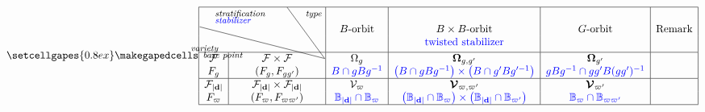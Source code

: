 \documentclass[border={7pt 0pt 200pt 0pt},varwidth]{standalone}
\newcommand{\dimvec}[1]{\mathbf{#1}}
\newcommand{\abdimvec}[1]{|\dimvec{#1}|}
\newcommand{\absgp}[1]{\mathbb{#1}}
\newcommand{\ww}{\varpi}
\newcommand{\Omcell}{\Omega}
\newcommand{\OOmcell}{\boldsymbol{\Omega}}
\newcommand{\Vcell}{\mathcal{V}}
\newcommand{\VVcell}{\boldsymbol{\mathcal{V}}}
\begin{document}
\begin{table}[ht]
 \[
 \setcellgapes{0.8ex}\makegapedcells
\centering
 \begin{array}{|c|c|c|c|c|c|}
 \hline
  \multicolumn{2}{|c|}{\multirow{3}{*}{\hbox{\diagbox[innerwidth=37mm,height=4\line,outerleftsep=-1ex,outerrightsep=-1ex,innerleftsep=3pt,innerrightsep=3pt,font=\footnotesize\itshape]
   {\hspace{-4mm}variety\\[-2mm]base point\\[-1mm]}
   {\hspace{4mm}stratification \\[-2mm] \hspace{4mm}\textcolor{blue}{stabilizer} \hspace{11mm}}
   {type}}}}&&&&\\
 \multicolumn{2}{|c|}{}& \text{$B$-orbit} & \text{$B \times B$-orbit} & \text{$G$-orbit} & \text{Remark}\rule{0mm}{4mm}\\
 \multicolumn{2}{|c|}{}&&\raisebox{1mm}{\textcolor{blue}{\text{twisted stabilizer}}}&&\rule{0mm}{4mm}\\
  \hline
  \mathcal{F} & \mathcal{F} \times \mathcal{F} & \Omcell_{g} & \OOmcell_{g,g'} & \OOmcell_{g'} &\\
  F_{g} & (F_{g},F_{gg'}) & \textcolor{blue}{B \cap gBg^{-1}} &\textcolor{blue}{\left( B \cap gBg^{-1}\right) \times \left(B \cap g'Bg'^{-1}\right)} & \textcolor{blue}{gBg^{-1} \cap gg'B(gg')^{-1}} &\\\hline
  
  \mathcal{F}_{\abdimvec{d}} & \mathcal{F}_{\abdimvec{d}} \times \mathcal{F}_{\abdimvec{d}} & \Vcell_{\ww} & \VVcell_{\ww,\ww'} & \VVcell_{\ww'} &\\
  F_{\ww} & (F_{\ww},F_{\ww\ww'}) & \textcolor{blue}{\absgp{B}_{\abdimvec{d}} \cap \absgp{B}_{\ww}} & \textcolor{blue}{\left(\absgp{B}_{\abdimvec{d}} \cap \absgp{B}_{\ww}\right) \times \left(\absgp{B}_{\abdimvec{d}} \cap \absgp{B}_{\ww'}\right) }& \textcolor{blue}{\absgp{B}_{\ww} \cap \absgp{B}_{\ww\ww'}} &\\\hline
  

\end{array}\]
\end{table}
\end{document}
